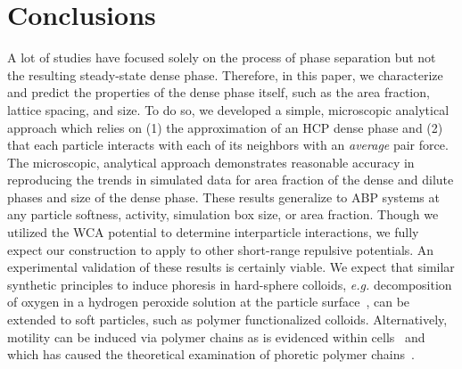\documentclass[twoside,twocolumn,9pt]{article}
\begin{document}
\section{Conclusions} \label{conclusions}

A lot of studies have focused solely on the process of phase separation but not the resulting steady-state dense phase. Therefore, in this paper, we characterize and predict the properties of the dense phase itself, such as the area fraction, lattice spacing, and size. To do so, we developed a simple, microscopic analytical approach which relies on (1) the approximation of an HCP dense phase and (2) that each particle interacts with each of its neighbors with an \textit{average} pair force. The microscopic, analytical approach demonstrates reasonable accuracy in reproducing the trends in simulated data for area fraction of the dense and dilute phases and size of the dense phase. These results generalize to ABP systems at any particle softness, activity, simulation box size, or area fraction. Though we utilized the WCA potential to determine interparticle interactions, we fully expect our construction to apply to other short-range repulsive potentials.  An experimental validation of these results is certainly viable. We expect that similar synthetic principles to induce phoresis in hard-sphere colloids, \textit{e.g.} decomposition of oxygen in a hydrogen peroxide solution at the particle surface~\cite{Palacci2013}, can be extended to soft particles, such as polymer functionalized colloids. Alternatively, motility can be induced via polymer chains as is evidenced within cells~\cite{Brangwynne2008CytoplasmicUp} and which has caused the theoretical examination of phoretic polymer chains~\cite{Sarkar2014RingPolymer}.
\end{document}
